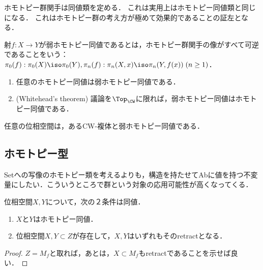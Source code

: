 \documentclass[uplatex, dvipdfmx]{jsreport}
\begin{document}
\begin{tcolorbox}[colframe=ForestGreen, colback=ForestGreen!10!white,breakable,colbacktitle=ForestGreen!40!white,coltitle=black,fonttitle=\bfseries\sffamily,
title=]
    ホモトピー群関手は同値類を定める．
    これは実用上はホモトピー同値類と同じになる．
    これはホモトピー群の考え方が極めて効果的であることの証左となる．
\end{tcolorbox}

\begin{definition}
    射$f:X\to Y$が弱ホモトピー同値であるとは，ホモトピー群関手の像がすべて可逆であることをいう：$\pi_0(f):\pi_0(X)\iso\pi_0(Y),\pi_n(f):\pi_n(X,x)\iso\pi_n(Y,f(x))\;(n\ge 1)$．
\end{definition}

\begin{proposition}\mbox{}
    \begin{enumerate}
        \item 任意のホモトピー同値は弱ホモトピー同値である．
        \item (Whitehead's theorem) 議論を$\Top_\CW$に限れば，弱ホモトピー同値はホモトピー同値である．
    \end{enumerate}
\end{proposition}

\begin{proposition}[CW approximation]
    任意の位相空間は，あるCW-複体と弱ホモトピー同値である．
\end{proposition}

\subsection{ホモトピー型}

\begin{tcolorbox}[colframe=ForestGreen, colback=ForestGreen!10!white,breakable,colbacktitle=ForestGreen!40!white,coltitle=black,fonttitle=\bfseries\sffamily,
title=]
    Setへの写像のホモトピー類を考えるよりも，構造を持たせてAbに値を持つ不変量にしたい．こういうところで群という対象の応用可能性が高くなってくる．
\end{tcolorbox}

\begin{corollary}[ホモトピー同値性の特徴付け]
    位相空間$X,Y$について，次の２条件は同値．
    \begin{enumerate}
        \item $X$と$Y$はホモトピー同値．
        \item 位相空間$X,Y\subset Z$が存在して，$X,Y$はいずれもそのretractとなる．
    \end{enumerate}
\end{corollary}
\begin{proof}
    $Z=M_f$と取れば，あとは，$X\subset M_f$もretractであることを示せば良い．
\end{proof}
\end{document}

